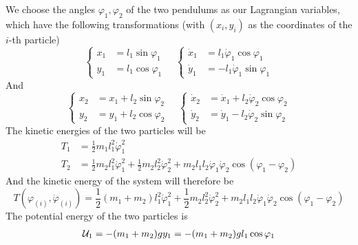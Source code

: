 \documentclass[../admech.tex]{subfiles}
\begin{document}
\begin{exe}
	We choose the angles $\varphi_1,\varphi_2$ of the two pendulums as our Lagrangian variables, which have the following transformations (with $(x_i,y_i)$ as the coordinates of the $i$-th particle)
	\begin{equation}
		\left\{ \begin{aligned}
			x_1&=l_1\sin\varphi_1\\
			y_1&=l_1\cos\varphi_1
	\end{aligned}\right.\quad\left\{ \begin{aligned}
			\dot{x}_1&=l_1\dot{\varphi}_1\cos\varphi_1\\
			\dot{y}_1&=-l_1\dot{\varphi}_1\sin\varphi_1
	\end{aligned}\right.
		\label{eq:dptr1}
	\end{equation}
	And
	\begin{equation}
		\left\{ \begin{aligned}
			x_2&=x_1+l_2\sin\varphi_2\\
			y_2&=y_1+l_2\cos\varphi_2
	\end{aligned}\right.\quad\left\{ \begin{aligned}
			\dot{x}_2&=\dot{x}_1+l_2\dot{\varphi}_2\cos\varphi_2\\
			\dot{y}_2&=\dot{y}_1-l_2\dot{\varphi}_2\sin\varphi_2
	\end{aligned}\right.
		\label{eq:dptr2}
	\end{equation}
	The kinetic energies of the two particles will be
	\begin{equation}
		\begin{aligned}
			T_1&=\frac{1}{2}m_1l_1^2\dot{\varphi}_1^2\\
			T_2&=\frac{1}{2}m_2l_1^2\dot{\varphi}_1^2+\frac{1}{2}m_2l_2^2\dot{\varphi}_2^2+m_2l_1l_2\dot{\varphi}_1\dot{\varphi}_2\cos(\varphi_1-\varphi_2)
		\end{aligned}
		\label{eq:tdpd}
	\end{equation}
	And the kinetic energy of the system will therefore be
	\begin{equation}
		T(\varphi_{(i)},\dot{\varphi}_{(i)})=\frac{1}{2}(m_1+m_2)l_1^2\dot{\varphi}_1^2+\frac{1}{2}m_2l_2^2\dot{\varphi}_2^2+m_2l_1l_2\dot{\varphi}_1\dot{\varphi}_2\cos(\varphi_1-\varphi_2)
		\label{eq:tdp}
	\end{equation}
	The potential energy of the two particles is
	\begin{equation}
		\begin{aligned}
			\pot_1&=-(m_1+m_2)gy_1=-(m_1+m_2)gl_1\cos\varphi_1\\

\end{aligned}
\end{equation}
\end{exe}
\end{document}
